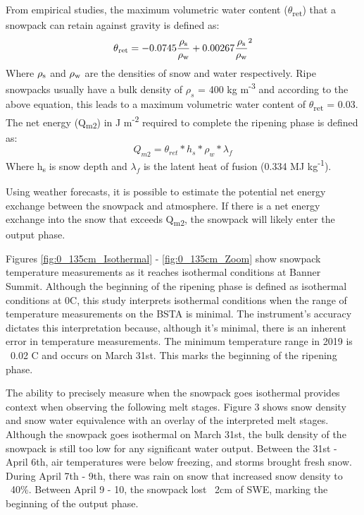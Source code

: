 From empirical studies, the maximum volumetric water content ($\theta$\textsubscript{ret}) that a snowpack can retain against gravity is defined as: 
\begin{equation}
\theta \textsubscript{ret} = -0.0745\frac{\rho \textsubscript{s}}{\rho \textsubscript{w}}
+ 0.00267\frac{\rho \textsubscript{s}}{\rho \textsubscript{w}}^2 
\end{equation}
Where $\rho \textsubscript{s}$ and $\rho \textsubscript{w}$ are the densities of snow and water respectively. Ripe snowpacks usually have a bulk density of $\rho_s$ = 400 kg m\textsuperscript{-3} and according to the above equation, this leads to a maximum volumetric water content of $\theta$\textsubscript{ret} = 0.03. The net energy (Q\textsubscript{m2}) in J m\textsuperscript{-2} required to complete the ripening phase is defined as: 
\begin{equation}
Q_{m2} = \theta_{ret} * h_s * \rho_w * \lambda_f
\end{equation}
Where h\textsubscript{s} is snow depth and $\lambda_f$ is the latent heat of fusion (0.334 MJ kg\textsuperscript{-1}). 

Using weather forecasts, it is possible to estimate the potential net energy exchange between the snowpack and atmosphere. If there is a net energy exchange into the snow that exceeds Q\textsubscript{m2}, the snowpack will likely enter the output phase.  

Figures \ref{fig:0_135cm_Isothermal} - \ref{fig:0_135cm_Zoom} show snowpack temperature measurements as it reaches isothermal conditions at Banner Summit. Although the beginning of the ripening phase is defined as isothermal conditions at 0C, this study interprets isothermal conditions when the range of temperature measurements on the BSTA is minimal. The instrument's accuracy dictates this interpretation because, although it's minimal, there is an inherent error in temperature measurements. The minimum temperature range in 2019 is ~0.02 C and occurs on March 31st. This marks the beginning of the ripening phase.

The ability to precisely measure when the snowpack goes isothermal provides context when observing the following melt stages. Figure 3 shows snow density and snow water equivalence with an overlay of the interpreted melt stages. Although the snowpack goes isothermal on March 31st, the bulk density of the snowpack is still too low for any significant water output. Between the 31st - April 6th, air temperatures were below freezing, and storms brought fresh snow. During April 7th - 9th, there was rain on snow that increased snow density to ~40\%. Between April 9 - 10, the snowpack lost ~2cm of SWE, marking the beginning of the output phase.    

